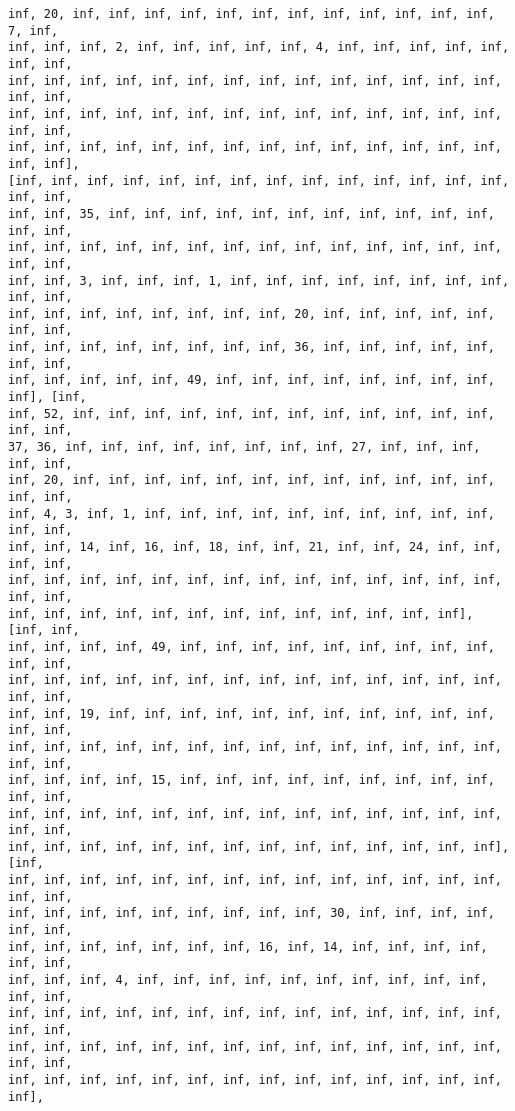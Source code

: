 \documentclass[11pt]{article}
\begin{document}
\begin{Verbatim}[commandchars=\\\{\}]
inf, 20, inf, inf, inf, inf, inf, inf, inf, inf, inf, inf, inf, inf, 7, inf,
inf, inf, inf, 2, inf, inf, inf, inf, inf, 4, inf, inf, inf, inf, inf, inf, inf,
inf, inf, inf, inf, inf, inf, inf, inf, inf, inf, inf, inf, inf, inf, inf, inf,
inf, inf, inf, inf, inf, inf, inf, inf, inf, inf, inf, inf, inf, inf, inf, inf,
inf, inf, inf, inf, inf, inf, inf, inf, inf, inf, inf, inf, inf, inf, inf, inf],
[inf, inf, inf, inf, inf, inf, inf, inf, inf, inf, inf, inf, inf, inf, inf, inf,
inf, inf, 35, inf, inf, inf, inf, inf, inf, inf, inf, inf, inf, inf, inf, inf,
inf, inf, inf, inf, inf, inf, inf, inf, inf, inf, inf, inf, inf, inf, inf, inf,
inf, inf, 3, inf, inf, inf, 1, inf, inf, inf, inf, inf, inf, inf, inf, inf, inf,
inf, inf, inf, inf, inf, inf, inf, inf, 20, inf, inf, inf, inf, inf, inf, inf,
inf, inf, inf, inf, inf, inf, inf, inf, 36, inf, inf, inf, inf, inf, inf, inf,
inf, inf, inf, inf, inf, 49, inf, inf, inf, inf, inf, inf, inf, inf, inf], [inf,
inf, 52, inf, inf, inf, inf, inf, inf, inf, inf, inf, inf, inf, inf, inf, inf,
37, 36, inf, inf, inf, inf, inf, inf, inf, inf, 27, inf, inf, inf, inf, inf,
inf, 20, inf, inf, inf, inf, inf, inf, inf, inf, inf, inf, inf, inf, inf, inf,
inf, 4, 3, inf, 1, inf, inf, inf, inf, inf, inf, inf, inf, inf, inf, inf, inf,
inf, inf, 14, inf, 16, inf, 18, inf, inf, 21, inf, inf, 24, inf, inf, inf, inf,
inf, inf, inf, inf, inf, inf, inf, inf, inf, inf, inf, inf, inf, inf, inf, inf,
inf, inf, inf, inf, inf, inf, inf, inf, inf, inf, inf, inf, inf], [inf, inf,
inf, inf, inf, inf, 49, inf, inf, inf, inf, inf, inf, inf, inf, inf, inf, inf,
inf, inf, inf, inf, inf, inf, inf, inf, inf, inf, inf, inf, inf, inf, inf, inf,
inf, inf, 19, inf, inf, inf, inf, inf, inf, inf, inf, inf, inf, inf, inf, inf,
inf, inf, inf, inf, inf, inf, inf, inf, inf, inf, inf, inf, inf, inf, inf, inf,
inf, inf, inf, inf, 15, inf, inf, inf, inf, inf, inf, inf, inf, inf, inf, inf,
inf, inf, inf, inf, inf, inf, inf, inf, inf, inf, inf, inf, inf, inf, inf, inf,
inf, inf, inf, inf, inf, inf, inf, inf, inf, inf, inf, inf, inf, inf], [inf,
inf, inf, inf, inf, inf, inf, inf, inf, inf, inf, inf, inf, inf, inf, inf, inf,
inf, inf, inf, inf, inf, inf, inf, inf, inf, 30, inf, inf, inf, inf, inf, inf,
inf, inf, inf, inf, inf, inf, inf, 16, inf, 14, inf, inf, inf, inf, inf, inf,
inf, inf, inf, 4, inf, inf, inf, inf, inf, inf, inf, inf, inf, inf, inf, inf,
inf, inf, inf, inf, inf, inf, inf, inf, inf, inf, inf, inf, inf, inf, inf, inf,
inf, inf, inf, inf, inf, inf, inf, inf, inf, inf, inf, inf, inf, inf, inf, inf,
inf, inf, inf, inf, inf, inf, inf, inf, inf, inf, inf, inf, inf, inf, inf],

\end{Verbatim}
\end{document}
